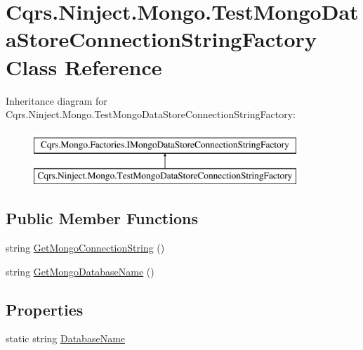 \hypertarget{classCqrs_1_1Ninject_1_1Mongo_1_1TestMongoDataStoreConnectionStringFactory}{}\section{Cqrs.\+Ninject.\+Mongo.\+Test\+Mongo\+Data\+Store\+Connection\+String\+Factory Class Reference}
\label{classCqrs_1_1Ninject_1_1Mongo_1_1TestMongoDataStoreConnectionStringFactory}
Inheritance diagram for Cqrs.\+Ninject.\+Mongo.\+Test\+Mongo\+Data\+Store\+Connection\+String\+Factory\+:\begin{figure}[H]
\begin{center}
\leavevmode
\includegraphics[height=2.000000cm]{classCqrs_1_1Ninject_1_1Mongo_1_1TestMongoDataStoreConnectionStringFactory}
\end{center}
\end{figure}
\subsection*{Public Member Functions}
\begin{DoxyCompactItemize}
\item 
string \hyperlink{classCqrs_1_1Ninject_1_1Mongo_1_1TestMongoDataStoreConnectionStringFactory_ae23b67139698984823fa7c250dcca47a}{Get\+Mongo\+Connection\+String} ()
\item 
string \hyperlink{classCqrs_1_1Ninject_1_1Mongo_1_1TestMongoDataStoreConnectionStringFactory_ac638a5771711c1d0746ee0ec55c5e192}{Get\+Mongo\+Database\+Name} ()
\end{DoxyCompactItemize}
\subsection*{Properties}
\begin{DoxyCompactItemize}
\item 
static string \hyperlink{classCqrs_1_1Ninject_1_1Mongo_1_1TestMongoDataStoreConnectionStringFactory_a911d570725e6702a9c1d16321202d89f}{Database\+Name}
\end{DoxyCompactItemize}


